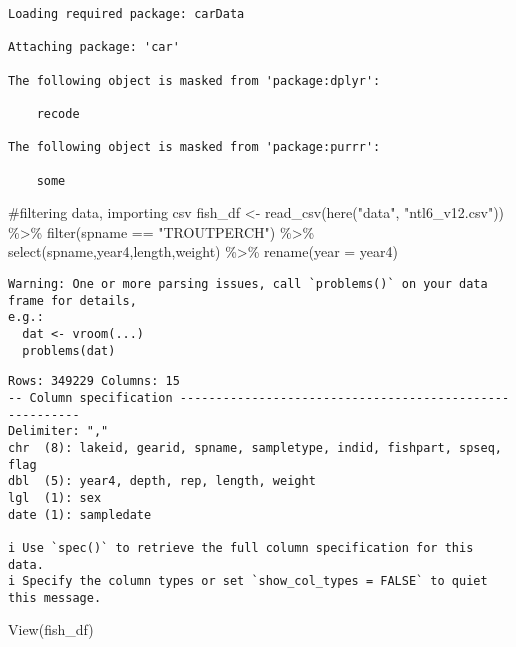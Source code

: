 \documentclass[
  letterpaper,
  DIV=11,
  numbers=noendperiod]{scrartcl}
\newenvironment{Shaded}{\begin{snugshade}}{\end{snugshade}}
\newcommand{\AttributeTok}[1]{\textcolor[rgb]{0.40,0.45,0.13}{#1}}
\newcommand{\CommentTok}[1]{\textcolor[rgb]{0.37,0.37,0.37}{#1}}
\newcommand{\FunctionTok}[1]{\textcolor[rgb]{0.28,0.35,0.67}{#1}}
\newcommand{\NormalTok}[1]{\textcolor[rgb]{0.00,0.23,0.31}{#1}}
\newcommand{\OtherTok}[1]{\textcolor[rgb]{0.00,0.23,0.31}{#1}}
\newcommand{\SpecialCharTok}[1]{\textcolor[rgb]{0.37,0.37,0.37}{#1}}
\newcommand{\StringTok}[1]{\textcolor[rgb]{0.13,0.47,0.30}{#1}}
\begin{document}
\begin{verbatim}
Loading required package: carData

Attaching package: 'car'

The following object is masked from 'package:dplyr':

    recode

The following object is masked from 'package:purrr':

    some
\end{verbatim}

\begin{Shaded}
\begin{Highlighting}[]
\CommentTok{\#filtering data, importing csv}
\NormalTok{fish\_df }\OtherTok{\textless{}{-}} \FunctionTok{read\_csv}\NormalTok{(}\FunctionTok{here}\NormalTok{(}\StringTok{"data"}\NormalTok{, }\StringTok{"ntl6\_v12.csv"}\NormalTok{)) }\SpecialCharTok{\%\textgreater{}\%} 
  \FunctionTok{filter}\NormalTok{(spname }\SpecialCharTok{==} \StringTok{"TROUTPERCH"}\NormalTok{) }\SpecialCharTok{\%\textgreater{}\%} 
  \FunctionTok{select}\NormalTok{(spname,year4,length,weight) }\SpecialCharTok{\%\textgreater{}\%} 
  \FunctionTok{rename}\NormalTok{(}\AttributeTok{year =}\NormalTok{ year4)}
\end{Highlighting}
\end{Shaded}

\begin{verbatim}
Warning: One or more parsing issues, call `problems()` on your data frame for details,
e.g.:
  dat <- vroom(...)
  problems(dat)
\end{verbatim}

\begin{verbatim}
Rows: 349229 Columns: 15
-- Column specification --------------------------------------------------------
Delimiter: ","
chr  (8): lakeid, gearid, spname, sampletype, indid, fishpart, spseq, flag
dbl  (5): year4, depth, rep, length, weight
lgl  (1): sex
date (1): sampledate

i Use `spec()` to retrieve the full column specification for this data.
i Specify the column types or set `show_col_types = FALSE` to quiet this message.
\end{verbatim}

\begin{Shaded}
\begin{Highlighting}[]
\FunctionTok{View}\NormalTok{(fish\_df)}
\end{Highlighting}
\end{Shaded}
\end{document}
